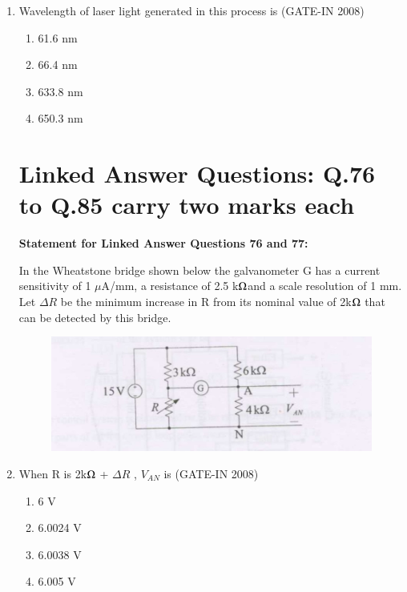 \documentclass[journal,12pt,onecolumn]{IEEEtran}
\theoremstyle{remark}
\begin{document}
\begin{enumerate}
\item  Wavelength of laser light generated in this process is \hfill{(GATE-IN 2008)}
\begin{multicols}{4}
           \begin{enumerate} 
              \item 61.6 nm       
              \item 66.4 nm
              \item 633.8 nm
              \item 650.3 nm
            \end{enumerate}
            \end{multicols}

\section*{Linked Answer Questions: Q.76 to Q.85 carry two marks each }
\textbf{Statement for Linked Answer Questions 76 and 77:}

In the Wheatstone bridge shown below  the galvanometer G has a current sensitivity of 1 $\mu$A/mm, a
resistance of 2.5 k$\ohm$and a scale resolution of 1 mm. Let $\Delta$$R$ be the minimum increase in R from its
nominal value of 2k$\ohm$ that can be detected by this bridge.

\begin{figure}[H]
    \centering
    \includegraphics[width=0.5\columnwidth]{figs/i33.jpg}
    \caption{}
    \label{fig:placeholder33}
\end{figure}

\item When R is 2k$\ohm$ + $\Delta$$R$ , $V_{AN}$ is \hfill{(GATE-IN 2008)}
\begin{multicols}{4}
           \begin{enumerate} 
              \item 6 V
              \item 6.0024 V
              \item 6.0038 V
              \item 6.005 V
            \end{enumerate}
            \end{multicols}





\end{enumerate}
\end{document}
